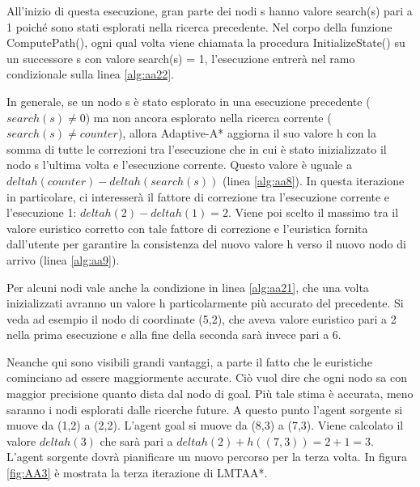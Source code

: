 \documentclass[12pt]{book}
\begin{document}
\par{All'inizio di questa esecuzione, gran parte dei nodi s hanno valore search(s) pari a 1 poich\'e sono stati esplorati nella ricerca precedente. Nel corpo della funzione ComputePath(), ogni qual volta viene chiamata la procedura InitializeState() su un successore s con valore search(s) = 1, l'esecuzione entrer\`a nel ramo condizionale sulla linea \ref{alg:aa22}.}
\par{In generale, se un nodo s \`e stato esplorato in una esecuzione precedente ($search(s) \neq 0$) ma non ancora esplorato nella ricerca corrente ($search(s) \neq counter$), allora Adaptive-A* aggiorna il suo valore h con la somma di tutte le correzioni tra l'esecuzione che in cui \`e stato inizializzato il nodo s l'ultima volta e l'esecuzione corrente. Questo valore \`e uguale a $deltah(counter) - deltah(search(s))$ (linea \ref{alg:aa8}). In questa iterazione in particolare, ci interesser\`a il fattore di correzione tra l'esecuzione corrente e l'esecuzione 1: $deltah(2) - deltah(1) = 2$. Viene poi scelto il massimo tra il valore euristico corretto con tale fattore di correzione e l'euristica fornita dall'utente per garantire la consistenza del nuovo valore h verso il nuovo nodo di arrivo (linea \ref{alg:aa9}).}
\par{Per alcuni nodi vale anche la condizione in linea \ref{alg:aa21}, che una volta inizializzati avranno un valore h particolarmente pi\`u accurato del precedente. Si veda ad esempio il nodo di coordinate (5,2), che aveva valore euristico pari a 2 nella prima esecuzione e alla fine della seconda sar\`a invece pari a 6.}
\par{Neanche qui sono visibili grandi vantaggi, a parte il fatto che le euristiche cominciano ad essere maggiormente accurate. Ci\`o vuol dire che ogni nodo sa con maggior precisione quanto dista dal nodo di goal. Pi\`u tale stima \`e accurata, meno saranno i nodi esplorati dalle ricerche future. A questo punto l'agent sorgente si muove da (1,2) a (2,2).  L'agent goal si muove da (8,3) a (7,3). Viene calcolato il valore $deltah(3)$ che sar\`a pari a $deltah(2) + h((7,3)) = 2 + 1 = 3$. L'agent sorgente dovr\`a pianificare un nuovo percorso per la terza volta. In figura \ref{fig:AA3} \`e mostrata la terza iterazione di LMTAA*.}
\end{document}
